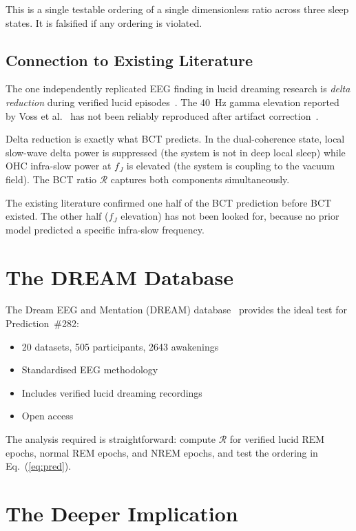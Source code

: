 \documentclass[aps,prl,twocolumn,showpacs,preprintnumbers]{revtex4-2}
\newcommand{\fJ}{f_J}
\begin{document}
This is a single testable ordering of a single dimensionless
ratio across three sleep states. It is falsified if any
ordering is violated.

\subsection{Connection to Existing Literature}

The one independently replicated EEG finding in lucid
dreaming research is \emph{delta reduction} during verified
lucid episodes~\cite{baird2022}. The 40~Hz gamma elevation
reported by Voss et al.~\cite{voss2009} has not been reliably
reproduced after artifact correction~\cite{baird2022}.

Delta reduction is exactly what BCT predicts. In the dual-coherence
state, local slow-wave delta power is suppressed (the system is
not in deep local sleep) while OHC infra-slow power at $\fJ$
is elevated (the system is coupling to the vacuum field).
The BCT ratio $\mathcal{R}$ captures both components
simultaneously.

The existing literature confirmed one half of the BCT prediction
before BCT existed. The other half ($\fJ$ elevation) has not
been looked for, because no prior model predicted a specific
infra-slow frequency.

\section{The DREAM Database}

The Dream EEG and Mentation (DREAM) database~\cite{dreams}
provides the ideal test for Prediction~\#282:
\begin{itemize}
\item 20 datasets, 505 participants, 2643 awakenings
\item Standardised EEG methodology
\item Includes verified lucid dreaming recordings
\item Open access
\end{itemize}

The analysis required is straightforward: compute $\mathcal{R}$
for verified lucid REM epochs, normal REM epochs, and NREM
epochs, and test the ordering in Eq.~(\ref{eq:pred}).

\section{The Deeper Implication}
\end{document}

